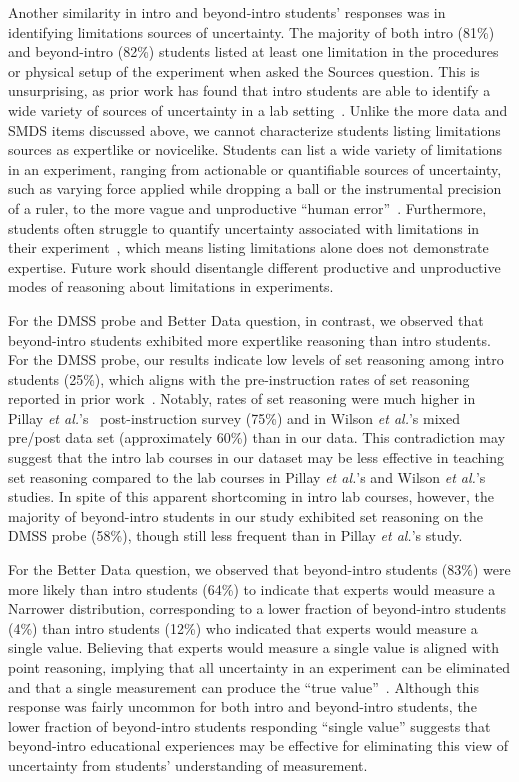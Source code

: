 \documentclass[english,aps,prstper,reprint,showpacs,longbibliography,superscriptaddress,nofootinbib]{revtex4-2}
\begin{document}
Another similarity in intro and beyond-intro students' responses was in identifying limitations sources of uncertainty. The majority of both intro (81\%) and beyond-intro (82\%) students listed at least one limitation in the procedures or physical setup of the experiment when asked the Sources question. This is unsurprising, as prior work has found that intro students are able to identify a wide variety of sources of uncertainty in a lab setting~\cite{Holmes2015,Etkina2008,Sere1993}. Unlike the more data and SMDS items discussed above, we cannot characterize students listing limitations sources as expertlike or novicelike. Students can list a wide variety of limitations in an experiment, ranging from actionable or quantifiable sources of uncertainty, such as varying force applied while dropping a ball or the instrumental precision of a ruler, to the more vague and unproductive ``human error''~\cite{Hu2018,Holmes2015,Sere2001,Evangelinos2002,Allie2003}. Furthermore, students often struggle to quantify uncertainty associated with limitations in their experiment~\cite{Sere1993,Etkina2008}, which means listing limitations alone does not demonstrate expertise. Future work should disentangle different productive and unproductive modes of reasoning about limitations in experiments.

For the DMSS probe and Better Data question, in contrast, we observed that beyond-intro students exhibited more expertlike reasoning than intro students. For the DMSS probe, our results indicate low levels of set reasoning among intro students (25\%), which aligns with the pre-instruction rates of set reasoning reported in prior work~\cite{Pillay2008,Allie1998}. Notably, rates of set reasoning were much higher in Pillay \textit{et al.}'s~\cite{Pillay2008} post-instruction survey (75\%) and in Wilson \textit{et al.}'s mixed pre/post data set (approximately 60\%) than in our data. This contradiction may suggest that the intro lab courses in our dataset may be less effective in teaching set reasoning compared to the lab courses in Pillay \textit{et al.}'s and Wilson \textit{et al.}'s studies. In spite of this apparent shortcoming in intro lab courses, however, the majority of beyond-intro students in our study exhibited set reasoning on the DMSS probe (58\%), though still less frequent than in Pillay \textit{et al.}'s study.

For the Better Data question, we observed that beyond-intro students (83\%) were more likely than intro students (64\%) to indicate that experts would measure a Narrower distribution, corresponding to a lower fraction of beyond-intro students (4\%) than intro students (12\%) who indicated that experts would measure a single value. Believing that experts would measure a single value is aligned with point reasoning, implying that all uncertainty in an experiment can be eliminated and that a single measurement can produce the ``true value''~\cite{Allie1998,Buffler2001,Lubben2001,Leach1998,Evangelinos1999}. Although this response was fairly uncommon for both intro and beyond-intro students, the lower fraction of beyond-intro students responding ``single value'' suggests that beyond-intro educational experiences may be effective for eliminating this view of uncertainty from students' understanding of measurement.
\end{document}
